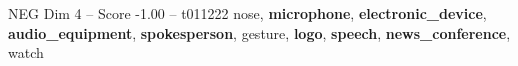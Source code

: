 \begin{textsample}{NEG Dim 4 – Score -1.00 – t011222}  \label{ex:f4_neg_037}
nose, \textbf{microphone}, \textbf{electronic\_device}, \textbf{audio\_equipment}, \textbf{spokesperson}, gesture, \textbf{logo}, \textbf{speech}, \textbf{news\_conference}, watch

\end{textsample}
